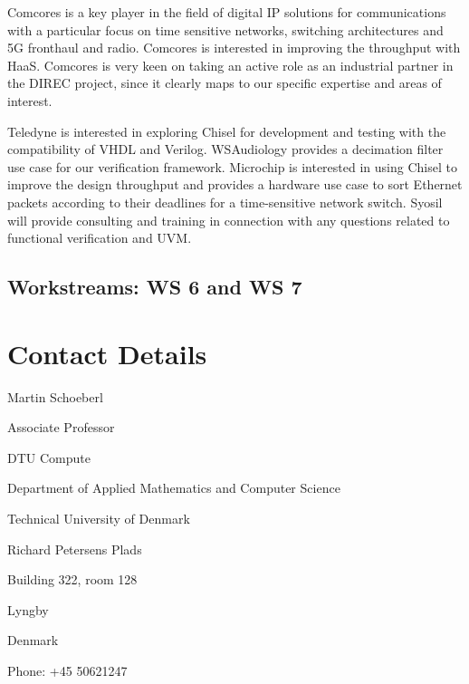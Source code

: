 \documentclass[fleqn,12pt]{article}
\begin{document}
Comcores is a key player in the field of digital IP solutions for communications with a particular focus on time sensitive networks, switching architectures and 5G fronthaul and radio.
Comcores is interested in improving the throughput with HaaS.
Comcores is very keen on taking an active role as an industrial partner in the DIREC project, since it clearly maps to our specific expertise and areas of interest.


Teledyne is interested in exploring Chisel for development and testing with the compatibility of VHDL and Verilog.
%
WSAudiology provides a decimation filter use case for our verification framework.
%
Microchip is interested in using Chisel to improve the design throughput and
provides a hardware use case to sort Ethernet packets according to their deadlines
for a time-sensitive network switch.
%
%
Syosil will provide consulting and training in connection with any questions related
to functional verification and UVM.

%


\subsection*{Workstreams: WS 6 and WS 7}


\section*{Contact Details}

Martin Schoeberl

\noindent Associate Professor

\bigskip

\noindent DTU Compute

\noindent Department of Applied Mathematics and Computer Science

\noindent Technical University of Denmark

\noindent Richard Petersens Plads

\noindent Building 322, room 128

 Lyngby

\noindent Denmark

\bigskip


\noindent Phone: +45 50621247
\end{document}
